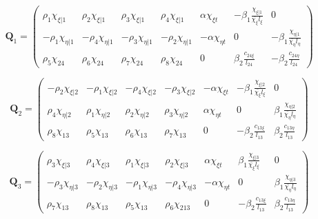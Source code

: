 \begin{equation} 
\mathbf{Q}_1 =
\begin{pmatrix}
\rho_1 \chi_{\xi | 1} & \rho_2 \chi_{\xi | 1} & \rho_3 \chi_{\xi | 1} & \rho_4 \chi_{\xi | 1} & \alpha \chi_{\xi t} & -\beta_1 \frac{\chi_{\xi | 1}}{\bar{\chi_\xi} l_\xi} & 0  \\	
-\rho_1 \chi_{\eta | 1} & -\rho_4 \chi_{\eta | 1} & -\rho_3 \chi_{\eta | 1} & -\rho_2 \chi_{\eta | 1} & -\alpha \chi_{\eta t} & 0 & -\beta_1 \frac{\chi_{\eta | 1}}{\bar{\chi_\eta} l_\eta} \\
\rho_5 \chi_{24} & \rho_6 \chi_{24} & \rho_7 \chi_{24} & \rho_8 \chi_{24} & 0 & \beta_2 \frac{c_{24 \xi}}{l_{24}} & -\beta_2 \frac{c_{24 \eta}}{l_{24}}
\end{pmatrix}		
\label{equation14}
\end{equation}

\begin{equation} 
\mathbf{Q}_2 =
\begin{pmatrix}
-\rho_2 \chi_{\xi | 2} & -\rho_1 \chi_{\xi | 2} & -\rho_4 \chi_{\xi | 2} & -\rho_3 \chi_{\xi | 2} & -\alpha \chi_{\xi t} & -\beta_1 \frac{\chi_{\xi | 2}}{\bar{\chi_\xi} l_\xi} & 0  \\	
\rho_4 \chi_{\eta | 2} & \rho_1 \chi_{\eta | 2} & \rho_2 \chi_{\eta | 2} & \rho_3 \chi_{\eta | 2} & \alpha \chi_{\eta t} & 0 & \beta_1 \frac{\chi_{\eta | 2}}{\bar{\chi_\eta} l_\eta} \\
\rho_8 \chi_{13} & \rho_5 \chi_{13} & \rho_6 \chi_{13} & \rho_7 \chi_{13} & 0 & -\beta_2 \frac{c_{13 \xi}}{l_{13}} & \beta_2 \frac{c_{13 \eta}}{l_{13}}
\end{pmatrix}		
\label{equation14_2}
\end{equation}

\begin{equation} 
\mathbf{Q}_3 =
\begin{pmatrix}
\rho_3 \chi_{\xi | 3} & \rho_4 \chi_{\xi | 3} & \rho_1 \chi_{\xi | 3} & \rho_2 \chi_{\xi | 3} & \alpha \chi_{\xi t} & \beta_1 \frac{\chi_{\xi | 3}}{\bar{\chi_\xi} l_\xi} & 0  \\	
-\rho_3 \chi_{\eta | 3} & -\rho_2 \chi_{\eta | 3} & -\rho_1 \chi_{\eta | 3} & -\rho_4 \chi_{\eta | 3} & -\alpha \chi_{\eta t} & 0 & \beta_1 \frac{\chi_{\eta | 3}}{\bar{\chi_\eta} l_\eta} \\
\rho_7 \chi_{13} & \rho_8 \chi_{13} & \rho_5 \chi_{13} & \rho_6 \chi_{213} & 0 & -\beta_2 \frac{c_{13 \xi}}{l_{13}} & \beta_2 \frac{c_{13 \eta}}{l_{13}}
\end{pmatrix}		
\label{equation14_3}
\end{equation}

